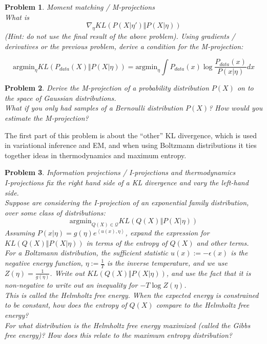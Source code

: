 \documentclass[a4paper]{article}
\newtheorem{problem}{Problem}[section]
\begin{document}
\begin{problem}
Moment matching / M-projections \\
What is 
\begin{equation}
  \nabla_\eta KL\left( P( X \vert \eta') \Vert P( X \vert \eta) \right)
  \label{}
\end{equation}
(Hint: do not use the final result of the above problem).
Using gradients / derivatives or the previous problem, derive a condition for the M-projection:

\begin{equation}
  \text{argmin}_\eta KL \left( P_{data}(X) \Vert P( X \vert \eta) \right) = \text{argmin}_\eta \int P_{data}(x) \log \frac{ P_{data}(x) }{ P( x \vert \eta) } dx
  \label{}
\end{equation}
\end{problem}

\begin{problem}
  Derive the M-projection of a probability distribution $P(X)$ on to the space of Gaussian distributions.  \\
  What if you only had samples of a Bernoulli distribution $P(X)$?  How would you estimate the M-projection?
\end{problem}

The first part of this problem is about the ``other'' KL divergence, which is used in variational inference and EM, and when using Boltzmann distributions it ties together ideas in thermodynamics and maximum entropy.

\begin{problem}
  Information projections / I-projections and thermodynamics\\
  I-projections fix the right hand side of a KL divergence and vary the left-hand side. \\
  Suppose are considering the I-projection of an exponential family distribution, over some class of distributions:
  \begin{equation}
    \text{argmin}_{Q(X) \in \mathcal{Q}} KL \left( Q(X) \Vert P( X \vert \eta) \right)
    \label{I-projection}
  \end{equation}
  Assuming $P(x \vert \eta) = g(\eta) e^{\left< u(x), \eta \right> }$, expand the expression for $KL\left( Q(X) \Vert P( X \vert \eta) \right)$ in terms of the entropy of $Q(X)$ and other terms. \\
  For a Boltzmann distribution, the sufficient statistic $u(x) := -\epsilon(x)$ is the negative energy function, $\eta := \frac{1}{T}$ is the inverse temperature, and we use $Z(\eta) = \frac{1}{g(\eta)}$.  Write out $KL \left( Q(X) \Vert P(X \vert \eta) \right)$, and use the fact that it is non-negative to write out an inequality for $- T \log Z(\eta)$. \\
  This is called the Helmholtz free energy.  When the expected energy is constrained to be constant, how does the entropy of $Q(X)$ compare to the Helmholtz free energy? \\
  For what distribution is the Helmholtz free energy maximized (called the Gibbs free energy)?  How does this relate to the maximum entropy distribution?
\end{problem}
\end{document}
